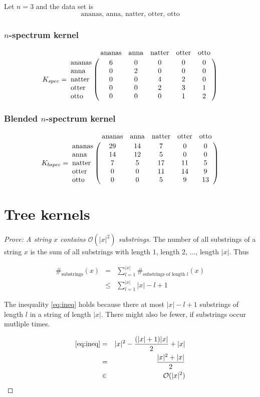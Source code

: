 \documentclass[a4paper, 12pt, titlepage]{article}
\begin{document}
Let $n=3$ and the data set is
\begin{displaymath}
	\text{ananas, anna, natter, otter, otto}
\end{displaymath}

\subsubsection{$n$-spectrum kernel}

\begin{displaymath}
	K_{spec} = \bordermatrix{
		& \text{ananas} & \text{anna} & \text{natter} & \text{otter} & \text{otto} \cr
		\text{ananas} & 6 & 0 & 0 & 0 & 0 \cr
		\text{anna} & 0 & 2 & 0 & 0 & 0 \cr
		\text{natter} & 0 & 0 & 4 & 2 & 0 \cr
		\text{otter} & 0 & 0 & 2 & 3 & 1 \cr
		\text{otto}  & 0 & 0 & 0 & 1 & 2
	}
\end{displaymath}

\subsubsection{Blended $n$-spectrum kernel}

\begin{displaymath}
	K_{bspec} = \bordermatrix{
		& \text{ananas} & \text{anna} & \text{natter} & \text{otter} & \text{otto} \cr
		\text{ananas} & 29 & 14 & 7 & 0 & 0 \cr
		\text{anna} & 14 & 12 & 5 & 0 & 0 \cr
		\text{natter} & 7 & 5 & 17 & 11 & 5 \cr
		\text{otter} & 0 & 0 & 11 & 14 & 9 \cr
		\text{otto}  & 0 & 0 & 5 & 9 & 13
	}
\end{displaymath}

\section{Tree kernels}

\begin{proof}[Prove: A string $x$ contains $\mathcal{O}(|x|^2)$ substrings]

The number of all substrings of a string $x$ is the sum of all substrings with length $1$, length $2$, $\ldots$, length $|x|$. Thus

\begin{eqnarray}
	\#_{\text{substrings}}(x) &=& \sum_{l=1}^{|x|} \#_{\text{substrings of length }l}(x) \nonumber\\
	&\le& \sum_{l=1}^{|x|} |x|-l+1 \label{eq:ineq}
\end{eqnarray}

The inequality \eqref{eq:ineq} holds because there at most $|x|-l+1$ substrings of length $l$ in a string of length $|x|$.
There might also be fewer, if substrings occur mutliple times.

\begin{eqnarray*}
	\eqref{eq:ineq} &=& |x|^2 - \frac{(|x|+1)|x|}{2} + |x|\\
		&=& \frac{|x|^2+|x|}{2}\\
		&\in& \mathcal{O}(|x|^2)
\end{eqnarray*}

\end{proof}
\end{document}
